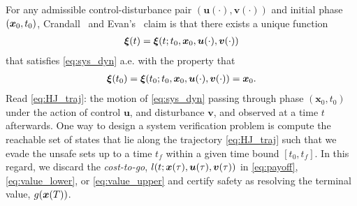 \noindent For any admissible control-disturbance pair $(\bm{u}(\cdot), \bm{v}(\cdot))$ and initial phase $(\bm{x}_0, t_0)$, Crandall~\cite{Crandall1983viscosity} and Evan's~\cite{Evans1984} claim is that there exists a unique function %
%
\begin{align}
	\bm{\xi}(t) = \bm{\xi}(t; t_0, \state_0, \bm{u}(\cdot), \bm{v}(\cdot))
	\label{eq:HJ_traj}
\end{align}
%
that satisfies \eqref{eq:sys_dyn} a.e. with the property that
\begin{align}
	\bm{\xi}(t_0) = \bm{\xi}(t_0; t_0, \bm{x}_0, \bm{u}(\cdot), \bm{v}(\cdot)) = \bm{x}_0.
\end{align}
%
Read \eqref{eq:HJ_traj}: the motion of \eqref{eq:sys_dyn} passing through phase $(\bm{x}_0, t_0)$ under the action of control $\bm{u}$, and disturbance $\bm{v}$, and observed at a time $t$ afterwards. One way to design a system verification problem is compute the reachable set of states that lie along the trajectory \eqref{eq:HJ_traj} such that we evade the unsafe sets up to a time \eg $t_f$ within a given time bound \eg $\left[t_0, t_f\right]$. In this regard, we discard the \textit{cost-to-go}, $l(t; \bm{x}(\tau), \bm{u}(\tau), \bm{v}(\tau))$ in \eqref{eq:payoff}, \eqref{eq:value_lower}, or \eqref{eq:value_upper} and certify safety as resolving the terminal value, $g(\bm{x}(T))$.

